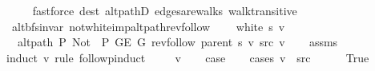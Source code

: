 \begin{isabellebody}
\ \ \ \ \isamarkupfalse%
\ {\isacharparenleft}{\kern0pt}fastforce\ dest{\isacharcolon}{\kern0pt}\ alt{\isacharunderscore}{\kern0pt}pathD{\isacharparenleft}{\kern0pt}{}{\isacharparenright}{\kern0pt}\ edges{\isacharunderscore}{\kern0pt}are{\isacharunderscore}{\kern0pt}walks\ walk{\isacharunderscore}{\kern0pt}transitive{\isacharparenright}{\kern0pt}\isanewline
{}\isamarkupfalse%
%
\endisatagproof
{\isafoldproof}%
%
\isadelimproof
\isanewline
%
\endisadelimproof
%
\isadeliminvisible
\isanewline
%
\endisadeliminvisible
%
\isataginvisible
{}\isamarkupfalse%
\ {\isacharparenleft}{\kern0pt}\ alt{\isacharunderscore}{\kern0pt}bfs{\isacharunderscore}{\kern0pt}invar{\isacharparenright}{\kern0pt}\ not{\isacharunderscore}{\kern0pt}white{\isacharunderscore}{\kern0pt}imp{\isacharunderscore}{\kern0pt}alt{\isacharunderscore}{\kern0pt}path{\isacharunderscore}{\kern0pt}rev{\isacharunderscore}{\kern0pt}follow{\isacharcolon}{\kern0pt}\isanewline
\ \ \ {\isachardoublequoteopen}{\isasymnot}\ white\ s\ v{\isachardoublequoteclose}\isanewline
\ \ \ {\isachardoublequoteopen}alt{\isacharunderscore}{\kern0pt}path\ P{\isacharprime}{\kern0pt}{\isacharprime}{\kern0pt}\ {\isacharparenleft}{\kern0pt}Not\ {\isasymcirc}\ P{\isacharprime}{\kern0pt}{\isacharprime}{\kern0pt}{\isacharparenright}{\kern0pt}\ {\isacharparenleft}{\kern0pt}G{\isachardot}{\kern0pt}E\ G{\isacharparenright}{\kern0pt}\ {\isacharparenleft}{\kern0pt}rev{\isacharunderscore}{\kern0pt}follow\ {\isacharparenleft}{\kern0pt}parent\ s{\isacharparenright}{\kern0pt}\ v{\isacharparenright}{\kern0pt}\ src\ v{\isachardoublequoteclose}%
\endisataginvisible
{\isafoldinvisible}%
%
\isadeliminvisible
\isanewline
%
\endisadeliminvisible
%
\isadelimproof
\ \ %
\endisadelimproof
%
\isatagproof
{}\isamarkupfalse%
\ assms\isanewline
{}\isamarkupfalse%
\ {\isacharparenleft}{\kern0pt}induct\ v\ rule{\isacharcolon}{\kern0pt}\ follow{\isacharunderscore}{\kern0pt}pinduct{\isacharparenright}{\kern0pt}\isanewline
\ \ \isamarkupfalse%
\ {\isacharparenleft}{\kern0pt}{}\ v{\isacharparenright}{\kern0pt}\isanewline
\ \ \isamarkupfalse%
\ {\isacharquery}{\kern0pt}case\isanewline
\ \ \isamarkupfalse%
\ {\isacharparenleft}{\kern0pt}cases\ {\isachardoublequoteopen}v\ {\isacharequal}{\kern0pt}\ src{\isachardoublequoteclose}{\isacharparenright}{\kern0pt}\isanewline
\ \ \ \ \isamarkupfalse%
\ True\isanewline
\ \ \ \ \isamarkupfalse%

\end{isabellebody}
